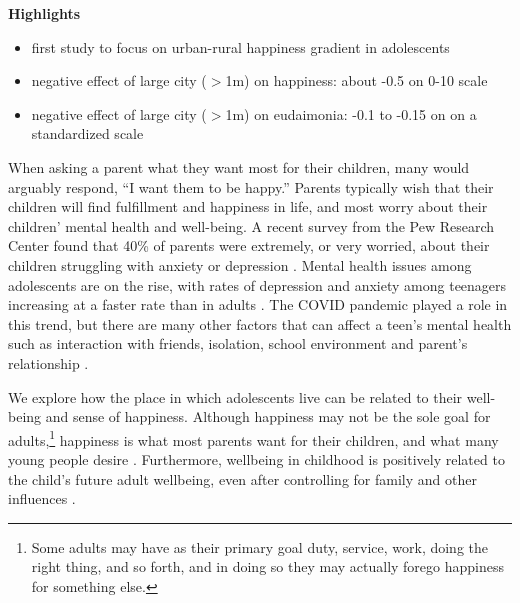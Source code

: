 \documentclass[10pt, letterpaper]{article}
\newcommand{\emd}[1]{\ExecuteMetaData[/tmp/tex]{#1}} %
\begin{document}
\begin{spacing}{1.4} %

\textbf{Highlights}

\begin{itemize}
\item first study to focus on urban-rural happiness gradient in adolescents
\item negative effect  of large city ($>$1m) on happiness: about -0.5 on
  0-10 scale
\item negative effect  of large city ($>$1m)  on eudaimonia: -0.1 to -0.15 on %
 on a standardized scale
\end{itemize}





\noindent 

When asking a parent what they want most for their children, many would arguably
respond, ``I want them to be happy.'' Parents typically wish that their children
will find fulfillment and happiness in life, and most worry about their children'
mental health and well-being. A recent survey from the Pew Research Center found
that 40\% of parents were extremely, or very worried, about their children
struggling with anxiety or depression \citep{pew}. Mental health issues among
adolescents are on the rise, with rates of depression and anxiety among
teenagers increasing at a faster rate than in adults \citep{cdc}. The COVID
pandemic  played a role in this trend, but there are many other factors that can
affect a teen's mental health such as interaction with friends, isolation,
school environment and parent's relationship \citep{twenge12,twenge14,twenge15,twengeATL17sep}. 

We explore how the place in which adolescents live can be related to their
well-being and sense of happiness. Although happiness may not be the sole goal
for adults,\footnote{Some adults may have as their primary goal duty, service, work, doing the
  right thing, and so forth, and in doing so they may actually forego happiness
  for something else.} happiness is what most parents want for their children, and what many young people desire \citep{humphrey2023}. Furthermore, wellbeing in childhood is positively related to the child's future adult
 wellbeing, even after controlling for family and other influences
 \citep{de2012estimating}. 
 


\end{spacing}
\end{document}
